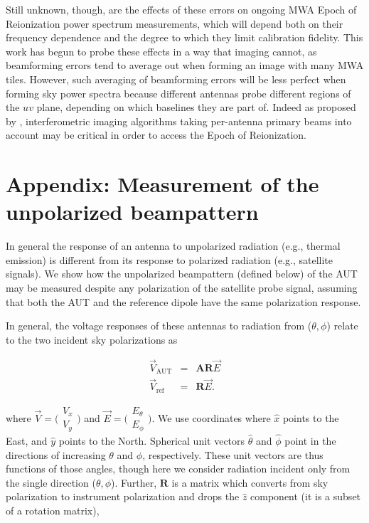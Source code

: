 Still unknown, though, are the effects of these errors on ongoing MWA Epoch of Reionization power spectrum measurements, which will depend both on their frequency dependence and the degree to which they limit calibration fidelity. This work has begun to probe these effects in a way that imaging cannot, as beamforming errors tend to average out when forming an image with many MWA tiles. However, such averaging of beamforming errors will be less perfect when forming sky power spectra because different antennas probe different regions of the $uv$ plane, depending on which baselines they are part of. Indeed as proposed by \citet{moralesandmatejek}, interferometric imaging algorithms taking per-antenna primary beams into account \citep{fhd, dillonmapmaking} may be critical in order to access the Epoch of Reionization.

\section{Appendix: Measurement of the unpolarized beampattern}
\label{sec:measurementappendix}

In general the response of an antenna to unpolarized radiation (e.g., thermal emission) is different from its response to polarized radiation (e.g., satellite signals). We show how the unpolarized beampattern (defined below) of the AUT may be measured despite any polarization of the satellite probe signal, assuming that both the AUT and the reference dipole have the same polarization response. 

In general, the voltage responses of these antennas to radiation from ($\theta,\phi$) relate to the two incident sky polarizations as

 \begin{eqnarray}
\vec{V}_\mathrm{AUT}&=&\textbf{A}\textbf{R}\vec{E}\label{eqn:measaut} \\
\vec{V}_\mathrm{ref}&=&\textbf{R}\vec{E}\label{eqn:measref}.
\end{eqnarray}

where $\vec{V}=\bigl(\begin{smallmatrix}V_x\\ V_y\end{smallmatrix} \bigr)$ and $\vec{E}=\bigl(\begin{smallmatrix}E_\theta \\ E_\phi\end{smallmatrix} \bigr)$. We use coordinates where $\hat{x}$ points to the East, and $\hat{y}$ points to the North. Spherical unit vectors $\hat{\theta}$ and $\hat{\phi}$ point in the directions of increasing $\theta$ and $\phi$, respectively. These unit vectors are thus functions of those angles, though here we consider radiation incident only from the single direction ($\theta,\phi$). Further, $\textbf{R}$ is a matrix which converts from sky polarization to instrument polarization and drops the $\hat{z}$ component (it is a subset of a rotation matrix),

